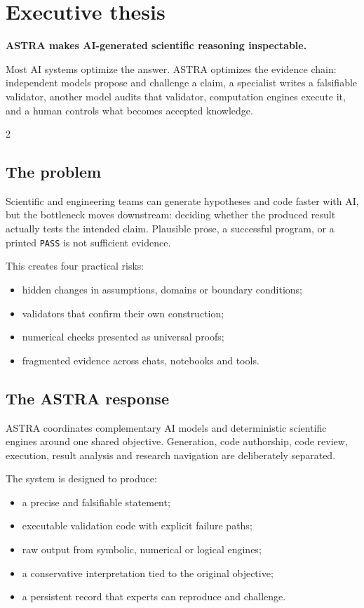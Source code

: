 \documentclass[10pt,a4paper]{article}
\begin{document}
\section*{Executive thesis}

\begin{darkbox}
{\Large\bfseries ASTRA makes AI-generated scientific reasoning inspectable.}\par
\vspace{2mm}
Most AI systems optimize the answer. ASTRA optimizes the evidence chain: independent
models propose and challenge a claim, a specialist writes a falsifiable validator,
another model audits that validator, computation engines execute it, and a human
controls what becomes accepted knowledge.
\end{darkbox}

\vspace{2mm}
\begin{multicols}{2}
\subsection*{The problem}

Scientific and engineering teams can generate hypotheses and code faster with AI, but
the bottleneck moves downstream: deciding whether the produced result actually tests
the intended claim. Plausible prose, a successful program, or a printed
\texttt{PASS} is not sufficient evidence.

This creates four practical risks:
\begin{itemize}
  \item hidden changes in assumptions, domains or boundary conditions;
  \item validators that confirm their own construction;
  \item numerical checks presented as universal proofs;
  \item fragmented evidence across chats, notebooks and tools.
\end{itemize}

\columnbreak
\subsection*{The ASTRA response}

ASTRA coordinates complementary AI models and deterministic scientific engines around
one shared objective. Generation, code authorship, code review, execution, result
analysis and research navigation are deliberately separated.

The system is designed to produce:
\begin{itemize}
  \item a precise and falsifiable statement;
  \item executable validation code with explicit failure paths;
  \item raw output from symbolic, numerical or logical engines;
  \item a conservative interpretation tied to the original objective;
  \item a persistent record that experts can reproduce and challenge.
\end{itemize}
\end{multicols}
\end{document}
